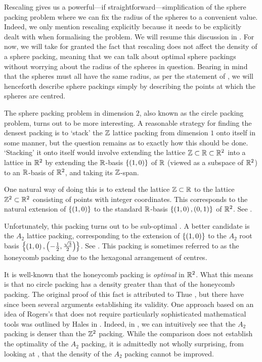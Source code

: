 Rescaling gives us a powerful---if straightforward---simplification of the sphere packing problem where we can fix the radius of the spheres to a convenient value. Indeed, we only mention rescaling explicitly because it needs to be explicitly dealt with when formalising the problem. We will resume this discussion in . For now, we will take for granted the fact that rescaling does not affect the density of a sphere packing, meaning that we can talk about optimal sphere packings without worrying about the radius of the spheres in question. Bearing in mind that the spheres must all have the same radius, as per the statement of , we will henceforth describe sphere packings simply by describing the points at which the spheres are centred.

The sphere packing problem in dimension $2$, also known as the circle packing problem, turns out to be more interesting. A reasonable strategy for finding the densest packing is to `stack' the $\mathbb{Z}$ lattice packing from dimension $1$ onto itself in some manner, but the question remains as to exactly how this should be done. `Stacking' it onto itself would involve extending the lattice $\mathbb{Z} \subset \mathbb{R} \subset \mathbb{R}^2$ into a lattice in $\mathbb{R}^2$ by extending the $\mathbb{R}$-basis $\left\{ \left( 1, 0 \right) \right\}$ of $\mathbb{R}$ (viewed as a subspace of $\mathbb{R}^2$) to an $\mathbb{R}$-basis of $\mathbb{R}^2$, and taking its $\mathbb{Z}$-span.

One natural way of doing this is to extend the lattice $\mathbb{Z} \subset \mathbb{R}$ to the lattice $\mathbb{Z}^2 \subset \mathbb{R}^2$ consisting of points with integer coordinates. This corresponds to the natural extension of $\left\{ \left( 1, 0 \right) \right\}$ to the standard $\mathbb{R}$-basis $\left\{ \left( 1, 0 \right), \left( 0, 1 \right) \right\}$ of $\mathbb{R}^2$. See .

Unfortunately, this packing turns out to be sub-optimal . A better candidate is the $A_2$ lattice packing, corresponding to the extension of $\left\{ \left( 1, 0 \right) \right\}$ to the $A_2$ root basis $\left\{ \left( 1, 0 \right), \left( -\frac{1}{2}, \frac{\sqrt{3}}{2} \right) \right\}$. See . This packing is sometimes referred to as the honeycomb packing due to the hexagonal arrangement of centres.

It is well-known that the honeycomb packing is \textit{optimal} in $\mathbb{R}^2$. What this means is that no circle packing has a density greater than that of the honeycomb packing. The original proof of this fact is attributed to Thue \cite{Thue}, but there have since been several arguments establishing its validity. One approach based on an idea of Rogers's that does not require particularly sophisticated mathematical tools was outlined by Hales in \cite{CannonHoney}. Indeed, in , we can intuitively see that the $A_2$ packing is denser than the $\mathbb{Z}^2$ packing. While the comparison does not establish the optimality of the $A_2$ packing, it is admittedly not wholly surprising, from looking at , that the density of the $A_2$ packing cannot be improved.

